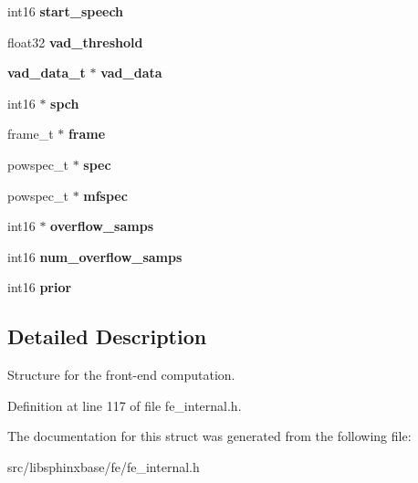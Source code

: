 \begin{DoxyCompactItemize}
int16 {\bfseries start\+\_\+speech}
\item 
\mbox{\label{structfe__s_a8c484564cca88e8aec167fe94bd27891}} 
float32 {\bfseries vad\+\_\+threshold}
\item 
\mbox{\label{structfe__s_aaae66e5327a74c4270c8f0decd4d4389}} 
\textbf{ vad\+\_\+data\+\_\+t} $\ast$ {\bfseries vad\+\_\+data}
\item 
\mbox{\label{structfe__s_a7d49693c1fa1b14bbcd25b87ad97935b}} 
int16 $\ast$ {\bfseries spch}
\item 
\mbox{\label{structfe__s_a6fe89784eb5d23ee812439f427d33fe6}} 
frame\+\_\+t $\ast$ {\bfseries frame}
\item 
\mbox{\label{structfe__s_af455b0ee3f8d81ca84ac88d4ea04e860}} 
powspec\+\_\+t $\ast$ {\bfseries spec}
\item 
\mbox{\label{structfe__s_a87fd448109884fc3d796b926b67697e7}} 
powspec\+\_\+t $\ast$ {\bfseries mfspec}
\item 
\mbox{\label{structfe__s_a7975216c6a540fa498352736404797b1}} 
int16 $\ast$ {\bfseries overflow\+\_\+samps}
\item 
\mbox{\label{structfe__s_ac22fe7c117ef00eb513d7d0771333ddd}} 
int16 {\bfseries num\+\_\+overflow\+\_\+samps}
\item 
\mbox{\label{structfe__s_ae6af635a19dac6426bf882a3fc5b069b}} 
int16 {\bfseries prior}
\end{DoxyCompactItemize}


\subsection{Detailed Description}
Structure for the front-\/end computation. 



Definition at line 117 of file fe\+\_\+internal.\+h.



The documentation for this struct was generated from the following file\+:\begin{DoxyCompactItemize}
\item 
src/libsphinxbase/fe/fe\+\_\+internal.\+h\end{DoxyCompactItemize}
